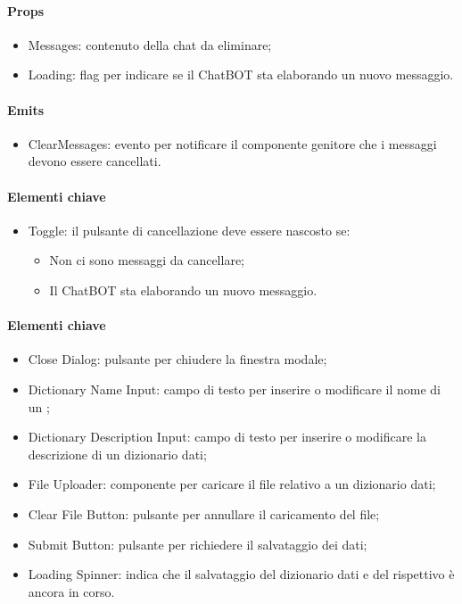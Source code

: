 
\paragraph*{Props}
\begin{itemize}
  \item Messages: contenuto della chat da eliminare;
  \item Loading: flag per indicare se il ChatBOT sta elaborando un nuovo messaggio.
\end{itemize}

\paragraph*{Emits}
\begin{itemize}
  \item ClearMessages: evento per notificare il componente genitore che i messaggi devono essere cancellati.
\end{itemize}

\paragraph*{Elementi chiave}
\begin{itemize}
  \item Toggle: il pulsante di cancellazione deve essere nascosto se:
  \begin{itemize}
    \item Non ci sono messaggi da cancellare;
    \item Il ChatBOT sta elaborando un nuovo messaggio.
  \end{itemize}
\end{itemize}


\paragraph*{Elementi chiave}
\begin{itemize}
  \item Close Dialog: pulsante per chiudere la finestra modale;
  \item Dictionary Name Input: campo di testo per inserire o modificare il nome di un ;
  \item Dictionary Description Input: campo di testo per inserire o modificare la descrizione di un dizionario dati;
  \item File Uploader: componente per caricare il file relativo a un dizionario dati;
  \item Clear File Button: pulsante per annullare il caricamento del file;
  \item Submit Button: pulsante per richiedere il salvataggio dei dati;
  \item Loading Spinner: indica che il salvataggio del dizionario dati e del rispettivo  è ancora in corso.
\end{itemize}

